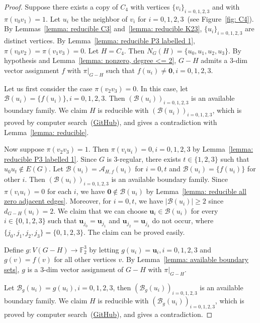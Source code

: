 \documentclass[
final
]{dmtcs-episciences}
\begin{document}
\begin{proof}  
    Suppose  there exists a copy of $C_4$ with vertices ${\{v_i\}}_{i=0,1,2,3}$ and with $\pi(v_0v_1) = 1$.
    Let $u_i$ be the neighbor of $v_i$ for $i=0,1,2,3$~(see Figure~\ref{fig: C4}).
    By Lemmas~\ref{lemma: reducible C3} and~\ref{lemma: reducible K23}, ${\{u_i\}}_{i=0,1,2,3}$ are distinct vertices.
    By Lemma~\ref{lemma: reducible P3 labelled 1}, $\pi(v_0v_2) = \pi(v_1v_3) = 0$.
    Let $H=C_4$. Then $N_G(H) = \{u_0, u_1,u_2, u_3\}$. 
    By hypothesis and Lemma~\ref{lemma: nonzero, degree <= 2}, $G-H$ admits a $3$-dim vector assignment $f$  with $\pi|_{G-H}$ such that  $f(u_i) \neq \mathbf{0}, i=0,1,2,3$.


    Let us first consider the case $\pi(v_2v_3) = 0$. In this case, let $\mathcal{B}(u_i) = \{f(u_i)\}, i=0,1,2,3$. Then ${(\mathcal{B}(u_i))}_{i=0,1,2,3}$ is an available boundary family. We claim $H$ is reducible with ${(\mathcal{B}(u_i))}_{i=0,1,2,3}$, which is proved by computer search~(\href{https://github.com/handsome12138/InversionDiameter}{GitHub}), and gives a contradiction with Lemma~\ref{lemma: reducible}.

    Now suppose $\pi(v_2v_3) = 1$. Then $\pi(v_i u_i) = 0, i=0,1,2,3$ by Lemma~\ref{lemma: reducible P3 labelled 1}.
    Since $G$ is 3-regular, there exists $t \in \{1,2,3\}$ such that $u_0u_t \notin E(G)$. Let $\mathcal{B}(u_i) = \mathcal{A}_{H,f}(u_i)$ for $i=0,t$ and $\mathcal{B}(u_i) = \{f(u_i)\}$ for other $i$.
    Then ${(\mathcal{B}(u_i))}_{i=0,1,2,3}$ is an available boundary family. Since $\pi(v_i u_i) = 0$ for each $i$, we have $\mathbf{0} \notin \mathcal{B}(u_i)$ by Lemma~\ref{lemma: reducible all zero adjacent edges}. Moreover, for $i=0,t$, we have $|\mathcal{B}(u_i) | \ge 2$ since $d_{G-H}(u_i) = 2$.
    We claim that we can choose $\mathbf{u}_i \in \mathcal{B}(u_i)$ for every $i\in \{0,1,2,3\}$ such that  $\mathbf{u}_{j_0} = \mathbf{u}_{j_1}$ and $\mathbf{u}_{j_2} = \mathbf{u}_{j_3}$ do not occur, where  $\{j_0,j_1,j_2,j_3\} = \{0,1,2,3\}$. The claim can be proved easily.

    Define $g: V(G-H) \rightarrow \mathbb{F}_2^3$ by letting $g(u_i) = \mathbf{u}_i, i=0,1,2,3$ and $g(v) = f(v)$ for all other vertices $v$. By Lemma~\ref{lemma: available boundary sets}, $g$ is a $3$-dim vector assignment of $G-H$ with $\pi|_{G-H}$.

    Let $\mathcal{B}_g(u_i) = g(u_i), i=0,1,2,3$, then ${(\mathcal{B}_g(u_i))}_{i=0,1,2,3}$ is an available boundary family.
    We claim $H$ is reducible with ${(\mathcal{B}_g(u_i))}_{i=0,1,2,3}$, which is proved by computer search~(\href{https://github.com/handsome12138/InversionDiameter}{GitHub}), and gives a contradiction.
\end{proof}
\end{document}
